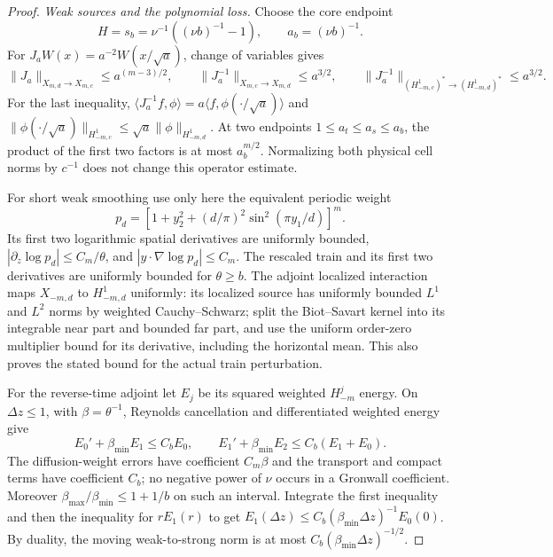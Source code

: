 \begin{proof}
\emph{Weak sources and the polynomial loss.}
Choose the core endpoint
\[
 H=s_b=\nu^{-1}((\nu b)^{-1}-1),\qquad a_b=(\nu b)^{-1}.
\]
For $J_aW(x)=a^{-2}W(x/\sqrt a)$, change of variables gives
\begin{equation}\label{eq:short-causal-scales}
 \|J_a\|_{X_{m,d}\to X_{m,c}}\le a^{(m-3)/2},\qquad
 \|J_a^{-1}\|_{X_{m,c}\to X_{m,d}}\le a^{3/2},\qquad
 \|J_a^{-1}\|_{(H^1_{-m,c})^*\to(H^1_{-m,d})^*}\le a^{3/2}.
\end{equation}
For the last inequality,
$\langle J_a^{-1}f,\phi\rangle=a\langle f,\phi(\cdot/\sqrt a)\rangle$
and $\|\phi(\cdot/\sqrt a)\|_{H^1_{-m,c}}
\le\sqrt a\|\phi\|_{H^1_{-m,d}}$. At two endpoints
$1\le a_t\le a_s\le a_b$, the product of the first two factors is
at most $a_b^{m/2}$. Normalizing both physical cell norms by $c^{-1}$
does not change this operator estimate.

For short weak smoothing use only here the equivalent periodic weight
\[
 p_d=[1+y_2^2+(d/\pi)^2\sin^2(\pi y_1/d)]^m.
\]
Its first two logarithmic spatial derivatives are uniformly bounded,
$|\partial_z\log p_d|\le C_m/\theta$, and
$|y\cdot\nabla\log p_d|\le C_m$. The rescaled train and its first
two derivatives are uniformly bounded for $\theta\ge b$.
The adjoint localized interaction maps $X_{-m,d}$ to $H^1_{-m,d}$
uniformly: its localized source has uniformly bounded $L^1$ and
$L^2$ norms by weighted Cauchy--Schwarz; split the Biot--Savart kernel
into its integrable near part and bounded far part, and use the
uniform order-zero multiplier bound for its derivative, including
the horizontal mean. This also proves the stated bound for the
actual train perturbation.

For the reverse-time adjoint let $E_j$ be its squared weighted
$H^j_{-m}$ energy. On $\Delta z\le1$, with
$\beta=\theta^{-1}$, Reynolds cancellation and differentiated
weighted energy give
\[
 E_0'+\beta_{\min}E_1\le C_bE_0,\qquad
 E_1'+\beta_{\min}E_2\le C_b(E_1+E_0).
\]
The diffusion-weight errors have coefficient $C_m\beta$ and the
transport and compact terms have coefficient $C_b$; no negative
power of $\nu$ occurs in a Gronwall coefficient. Moreover
$\beta_{\max}/\beta_{\min}\le1+1/b$ on such an interval.
Integrate the first inequality and then the inequality for $rE_1(r)$
to get $E_1(\Delta z)\le C_b(\beta_{\min}\Delta z)^{-1}E_0(0)$.
By duality, the moving weak-to-strong norm is at most
$C_b(\beta_{\min}\Delta z)^{-1/2}$.


\end{proof}
